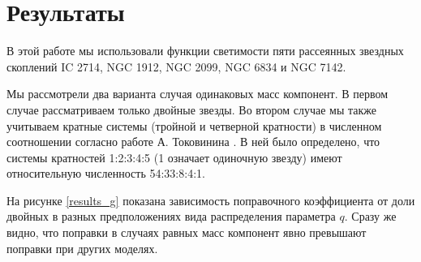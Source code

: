 \documentclass[a4paper,12pt]{article}
\begin{document}
\section*{Результаты}

В этой работе мы использовали функции светимости пяти рассеянных звездных скоплений IC 2714, NGC 1912, NGC 2099, NGC 6834 и NGC 7142.

Мы рассмотрели два варианта случая одинаковых масс компонент.  В первом случае рассматриваем только двойные звезды. Во втором случае мы также учитываем кратные системы (тройной и четверной кратности) в численном соотношении согласно работе А. Токовинина \cite{Tokovinin}. В ней было определено, что системы кратностей 1:2:3:4:5 (1 означает одиночную звезду) имеют относительную численность 54:33:8:4:1.

На рисунке \ref{results_g} показана зависимость поправочного коэффициента от доли двойных в разных предположениях вида распределения параметра $q$. Сразу же видно, что поправки в случаях равных масс компонент явно превышают поправки при других моделях.
\end{document}
